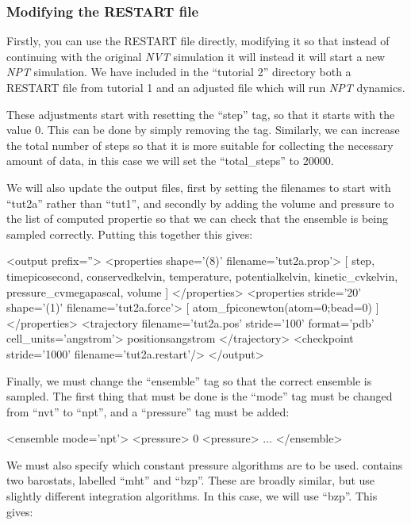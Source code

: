 \documentclass[11pt,english,fleqn]{report}
\newenvironment{code}{%
\footnotesize 
\verbatim
}{
\endverbatim
\normalsize
}
\begin{document}
\subsubsection{Modifying the RESTART file}

Firstly, you can use the RESTART file directly, modifying it
so that instead of continuing with the original \emph{NVT} simulation
it will instead it will start a new \emph{NPT} simulation. We have included
in the {}``tutorial 2'' directory both a RESTART file from
tutorial 1 and an adjusted file which will run \emph{NPT} dynamics.

These adjustments start with resetting the {}``step'' tag, so that
it starts with the value 0. This can be done by simply removing the
tag. Similarly, we can increase the total number of
steps so that it is more suitable for collecting the necessary
amount of data, in this case we will set the 
{}``total\_steps'' to 20000.

We will also update the output files, first by setting the filenames
to start with {}``tut2a'' rather than {}``tut1'', and secondly by adding
the volume and pressure to the list of computed propertie so that
we can check that the ensemble is being sampled correctly.
Putting this together this gives:

\small
\begin{code}
<output prefix=''>
   <properties shape='(8)' filename='tut2a.prop'>
      [ step, time{picosecond}, conserved{kelvin}, 
        temperature, potential{kelvin}, kinetic_cv{kelvin}, 
        pressure_cv{megapascal}, volume ] 
   </properties>
   <properties stride='20' shape='(1)' filename='tut2a.force'> 
      [ atom_f{piconewton}(atom=0;bead=0) ] 
   </properties>
   <trajectory filename='tut2a.pos' stride='100' format='pdb' cell_units='angstrom'>
      positions{angstrom}
   </trajectory>
   <checkpoint stride='1000' filename='tut2a.restart'/>
</output>
\end{code}
\normalsize

Finally, we must change the {}``ensemble'' tag so that the correct
ensemble is sampled. The first thing that must be done is  
the {}``mode'' tag must be changed from {}``nvt'' to {}``npt'',
and a {}``pressure'' tag must be added:

\begin{code}
<ensemble mode='npt'>
   <pressure> 0 <pressure>
   ...
</ensemble>
\end{code}

We must also specify which constant pressure algorithms are to be used.
\ipi contains two barostats, labelled {}``mht'' and {}``bzp''. These are
broadly similar, but use slightly different integration algorithms.
In this case, we will use {}``bzp''. This gives:
\end{document}
